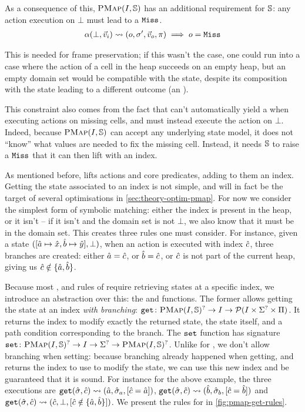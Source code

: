 As a consequence of this, $\textsc{PMap}(I,\mathbb S)$ has an additional requirement for $\mathbb S$: any action execution on $\bot$ must lead to a $\texttt{Miss}$. \begin{align*}
	\alpha(\bot,\vec{v}_i)\rightsquigarrow(o,\sigma',\vec{v}_o,\pi) \implies o=\texttt{Miss}
\end{align*}

This is needed for frame preservation; if this wasn't the case, one could run into a case where the action of a cell in the heap succeeds on an empty heap, but an empty domain set would be compatible with the state, despite its composition with the state leading to a different outcome (an \Err).

This constraint also comes from the fact that \PMap{} can't automatically yield a \Miss{} when executing actions on missing cells, and must instead execute the action on $\bot$. Indeed, because $\textsc{PMap}(I,\mathbb S)$ can accept any underlying state model, it does not ``know'' what values are needed to fix the missing cell. Instead, it needs $\mathbb S$ to raise a $\texttt{Miss}$ that it can then lift with an index.

As mentioned before, \PMap{} lifts actions and core predicates, adding to them an index. Getting the state associated to an index is not simple, and will in fact be the target of several optimisations in \cref{sec:theory-optim-pmap}. For now we consider the simplest form of symbolic matching: either the index is present in the heap, or it isn't -- if it isn't and the domain set is not $\bot$, we also know that it must be in the domain set. This creates three rules one must consider. For instance, given a state $([\hat{a}\mapsto \hat{x}, \hat{b} \mapsto \hat{y}], \bot)$, when an action is executed with index $\hat{c}$, three branches are created: either $\hat{a} = \hat{c}$, or $\hat{b} = \hat{c}$, or $\hat{c}$ is not part of the current heap, giving us $\hat{c}\notin \{\hat{a},\hat{b}\}$.

Because most \execac, \consume{} and \produce{} rules of \PMap{} require retrieving states at a specific index, we introduce an abstraction over this: the  and  functions. The former allows getting the state at an index \emph{with branching}: $\texttt{get}\colon \textsc{PMap}(I,\mathbb S)^? \rightarrow I \rightarrow {\cal P}(I \times \Sigma^? \times \Pi)$. It returns the index to modify exactly the returned state, the state itself, and a path condition corresponding to the branch. The $\texttt{set}$ function has signature $\texttt{set}\colon \textsc{PMap}(I,\mathbb S)^?\rightarrow I \rightarrow \Sigma^? \rightarrow \textsc{PMap}(I,\mathbb S)^?$. Unlike for , we don't allow branching when setting: because branching already happened when getting, and  returns the index to use to modify the state, we can use this new index and be guaranteed that it is sound. For instance for the above example, the three executions are ${\texttt{get}(\hat{\sigma},\hat{c})\rightsquigarrow(\hat{a}, \hat{\sigma}_a, [\hat{c} = \hat{a}])}$, ${\texttt{get}(\hat{\sigma}, \hat{c})\rightsquigarrow(\hat{b}, \hat{\sigma}_b, [\hat{c} = \hat{b}])}$ and ${\texttt{get}(\hat{\sigma},\hat{c})\rightsquigarrow(\hat{c}, \bot, [\hat{c}\notin \{\hat{a},\hat{b}\}])}$. We present the rules for  in \autoref{fig:pmap-get-rules}.

